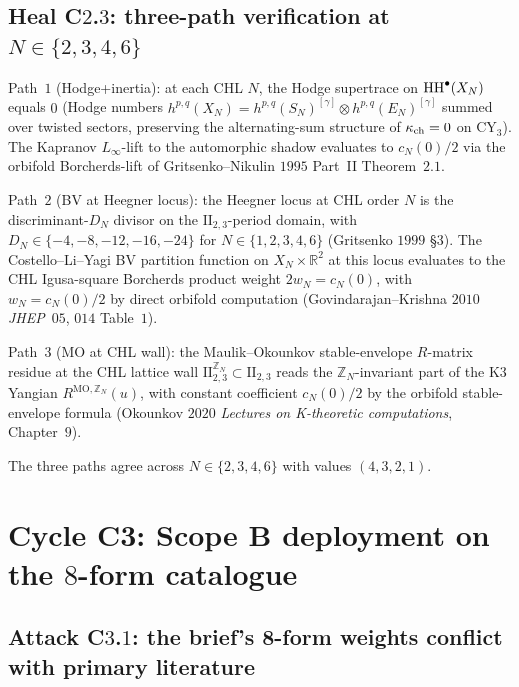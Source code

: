 \subsection*{Heal C$2$.$3$: three-path verification at $N \in \{2, 3, 4, 6\}$}

Path~$1$ (Hodge+inertia): at each CHL $N$, the Hodge supertrace on
$\mathrm{HH}^\bullet(X_N)$ equals $0$ (Hodge numbers
$h^{p, q}(X_N) = h^{p, q}(S_N)^{[\gamma]} \otimes h^{p, q}(E_N)^{[\gamma]}$
summed over twisted sectors, preserving the alternating-sum structure
of $\kappa_{\mathrm{ch}} = 0$ on CY$_3$). The Kapranov $L_\infty$-lift to the automorphic
shadow evaluates to $c_N(0)/2$ via the orbifold Borcherds-lift of
Gritsenko--Nikulin $1995$ Part~II Theorem~$2.1$.

Path~$2$ (BV at Heegner locus): the Heegner locus at CHL order $N$ is
the discriminant-$D_N$ divisor on the $\mathrm{II}_{2, 3}$-period
domain, with $D_N \in \{-4, -8, -12, -16, -24\}$ for $N \in
\{1, 2, 3, 4, 6\}$ (Gritsenko $1999$ \S$3$). The Costello--Li--Yagi BV
partition function on $X_N \times \mathbb{R}^2$ at this locus evaluates
to the CHL Igusa-square Borcherds product weight $2 w_N = c_N(0)$, with
$w_N = c_N(0)/2$ by direct orbifold computation (Govindarajan--Krishna
$2010$ \emph{JHEP}~$05$, $014$ Table~$1$).

Path~$3$ (MO at CHL wall): the Maulik--Okounkov stable-envelope
$R$-matrix residue at the CHL lattice wall
$\mathrm{II}_{2, 3}^{\mathbb{Z}_N} \subset \mathrm{II}_{2, 3}$ reads
the $\mathbb{Z}_N$-invariant part of the K$3$ Yangian
$R^{\mathrm{MO}, \mathbb{Z}_N}(u)$, with constant coefficient $c_N(0)/2$
by the orbifold stable-envelope formula (Okounkov $2020$ \emph{Lectures
on K-theoretic computations}, Chapter~$9$).

The three paths agree across $N \in \{2, 3, 4, 6\}$ with values
$(4, 3, 2, 1)$.

\section{Cycle C3: Scope B deployment on the $8$-form catalogue}
\label{sec:cycle-c3-8form-deployment}

\subsection*{Attack C$3$.$1$: the brief's 8-form weights conflict with
primary literature}

